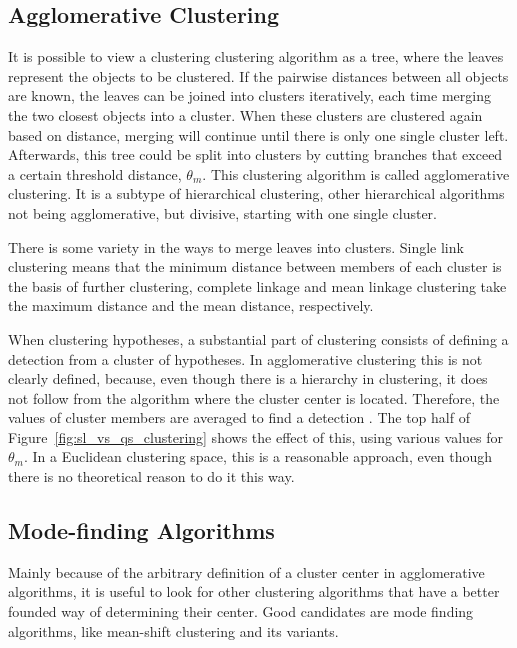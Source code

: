 \subsection{Agglomerative Clustering} %
\label{sub:agglomerative_clustering}

It is possible to view a clustering clustering algorithm as a tree, where the leaves represent the objects to be clustered. If the pairwise distances between all objects are known, the leaves can be joined into clusters iteratively, each time merging the two closest objects into a cluster. When these clusters are clustered again based on distance, merging will continue until there is only one single cluster left. Afterwards, this tree could be split into clusters by cutting branches that exceed a certain threshold distance, $\theta_m$. This clustering algorithm is called agglomerative clustering. It is a subtype of hierarchical clustering, other hierarchical algorithms not being agglomerative, but divisive, starting with one single cluster.

There is some variety in the ways to merge leaves into clusters. Single link clustering means that the minimum distance between members of each cluster is the basis of further clustering, complete linkage and mean linkage clustering take the maximum distance and the mean distance, respectively.

When clustering hypotheses, a substantial part of clustering consists of defining a detection from a cluster of hypotheses. In agglomerative clustering this is not clearly defined, because, even though there is a hierarchy in clustering, it does not follow from the algorithm where the cluster center is located. Therefore, the values of cluster members are averaged to find a detection \cite{becker2012codebook}. The top half of Figure~\ref{fig:sl_vs_qs_clustering} shows the effect of this, using various values for $\theta_m$. In a Euclidean clustering space, this is a reasonable approach, even though there is no theoretical reason to do it this way.


\subsection{Mode-finding Algorithms} %
\label{sub:mode_finding_algorithms}

Mainly because of the arbitrary definition of a cluster center in agglomerative algorithms, it is useful to look for other clustering algorithms that have a better founded way of determining their center. Good candidates are mode finding algorithms, like mean-shift clustering and its variants. \cite{cheng1995mean,vedaldi2008quick}

